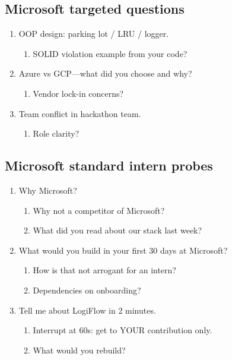 \documentclass[9pt,a4paper]{article}
\begin{document}
\subsection{Microsoft targeted questions}
\begin{enumerate}[label=\textbf{Q\arabic*:}, leftmargin=*]
  \item OOP design: parking lot / LRU / logger.
  \begin{enumerate}[label=\textit{FU\arabic*:}, leftmargin=2em]
    \item SOLID violation example from your code?
  \end{enumerate}
  \item Azure vs GCP---what did you choose and why?
  \begin{enumerate}[label=\textit{FU\arabic*:}, leftmargin=2em]
    \item Vendor lock-in concerns?
  \end{enumerate}
  \item Team conflict in hackathon team.
  \begin{enumerate}[label=\textit{FU\arabic*:}, leftmargin=2em]
    \item Role clarity?
  \end{enumerate}
\end{enumerate}
\subsection{Microsoft standard intern probes}
\begin{enumerate}[label=\textbf{Q\arabic*:}, leftmargin=*]
  \item Why Microsoft?
  \begin{enumerate}[label=\textit{FU\arabic*:}, leftmargin=2em]
    \item Why not a competitor of Microsoft?
    \item What did you read about our stack last week?
  \end{enumerate}
  \item What would you build in your first 30 days at Microsoft?
  \begin{enumerate}[label=\textit{FU\arabic*:}, leftmargin=2em]
    \item How is that not arrogant for an intern?
    \item Dependencies on onboarding?
  \end{enumerate}
  \item Tell me about LogiFlow in 2 minutes.
  \begin{enumerate}[label=\textit{FU\arabic*:}, leftmargin=2em]
    \item Interrupt at 60s: get to YOUR contribution only.
    \item What would you rebuild?
  \end{enumerate}
\end{enumerate}
\newpage
\end{document}
